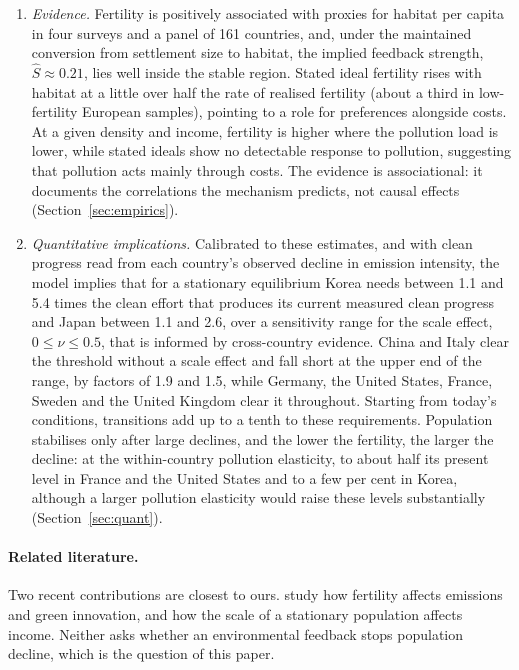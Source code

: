 \documentclass[11pt]{article}
\begin{document}
\begin{enumerate}
\item \emph{Evidence.} Fertility is positively associated with proxies for habitat per capita in four
surveys and a panel of 161 countries, and, under the maintained conversion from settlement size to
habitat, the implied feedback strength, $\hat S\approx0.21$, lies well inside the stable region. Stated
ideal fertility rises with habitat at a little over half the rate of realised fertility (about a third
in low-fertility European samples), pointing to a role for preferences alongside costs. At a given density and income, fertility is higher where the
pollution load is lower, while stated ideals show no detectable response to pollution, suggesting that
pollution acts mainly through costs. The evidence is associational: it documents the correlations the mechanism
predicts, not causal effects (Section~\ref{sec:empirics}).
\item \emph{Quantitative implications.} Calibrated to these estimates, and with clean progress read from
each country's observed decline in emission intensity, the model implies that for a stationary
equilibrium Korea needs between 1.1 and 5.4 times the clean effort that produces its current measured
clean progress and Japan between 1.1 and 2.6, over a sensitivity range for the scale effect,
$0\le\nu\le0.5$, that is informed by cross-country evidence. China and Italy clear the threshold
without a scale effect and fall short at the upper end of the range, by factors of 1.9 and 1.5, while
Germany, the United States, France, Sweden and the United Kingdom clear it throughout. Starting from
today's conditions, transitions add up to a tenth to these requirements. Population stabilises only
after large declines, and the lower the fertility, the larger the decline: at the within-country
pollution elasticity, to about half its present level in France and the United States and to a few per
cent in Korea, although a larger pollution elasticity would raise these levels substantially
(Section~\ref{sec:quant}).
\end{enumerate}

\paragraph{Related literature.}
Two recent contributions are closest to ours. \citet{beulmann2025} study how fertility affects
emissions and green innovation, and \citet{edenkuruc2026} how the scale of a stationary population
affects income. Neither asks whether an environmental feedback stops population decline, which is the
question of this paper.
\end{document}
